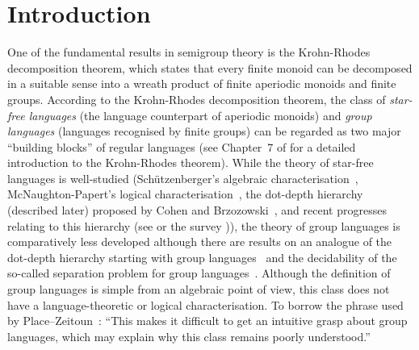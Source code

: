 \section{Introduction}
One of the fundamental results in semigroup theory is the Krohn-Rhodes decomposition theorem, which states that every finite monoid can be decomposed in a suitable sense into a wreath product of finite aperiodic monoids and finite groups.
According to the Krohn-Rhodes decomposition theorem, the class of \emph{star-free languages} (the language counterpart of aperiodic monoids) and \emph{group languages} (languages recognised by finite groups) can be regarded as two major ``building blocks'' of regular languages (see Chapter~7 of \cite{DAM} for a detailed introduction to the Krohn-Rhodes theorem).
While the theory of star-free languages is well-studied (\eg Sch\"utzenberger's algebraic characterisation~\cite{Schutzenberger1965190},  McNaughton-Papert's logical characterisation~\cite{counterfree}, the dot-depth hierarchy (described later) proposed by Cohen and Brzozowski~\cite{dot}, and recent progresses relating to this hierarchy (see \cite{dot3} or the survey \cite{dotdepth})), the theory of group languages is comparatively less developed although there are results on an analogue of the dot-depth hierarchy starting with group languages~\cite{margolis} and the decidability of the so-called separation problem for group languages~\cite{place}.
Although the definition of group languages is simple from an algebraic point of view, this class does not have a language-theoretic or logical characterisation.
To borrow the phrase used by Place--Zeitoun~\cite{place}: ``This makes it difficult to get an intuitive grasp about group languages, which may explain why this class remains poorly understood.''


